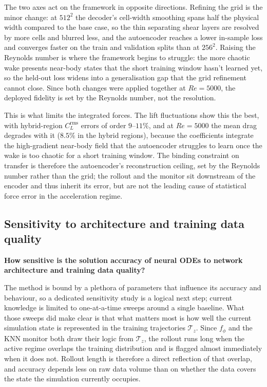 The two axes act on the framework in opposite directions. Refining the grid is the minor change: at $512^2$ the decoder's cell-width smoothing spans half the physical width compared to the base case, so the thin separating shear layers are resolved by more cells and blurred less, and the autoencoder reaches a lower in-sample loss and converges faster on the train and validation splits than at $256^2$. Raising the Reynolds number is where the framework begins to struggle: the more chaotic wake presents near-body states that the short training window hasn't learned yet, so the held-out loss widens into a generalisation gap that the grid refinement cannot close. Since both changes were applied together at $Re=5000$, the deployed fidelity is set by the Reynolds number, not the resolution.

This is what limits the integrated forces. The lift fluctuations show this the best, with hybrid-region $C_L^\text{rms}$ errors of order $9$--$11\%$, and at $Re=5000$ the mean drag degrades with it ($8.5\%$ in the hybrid regions), because the coefficients integrate the high-gradient near-body field that the autoencoder struggles to learn once the wake is too chaotic for a short training window. The binding constraint on transfer is therefore the autoencoder's reconstruction ceiling, set by the Reynolds number rather than the grid; the rollout and the monitor sit downstream of the encoder and thus inherit its error, but are not the leading cause of statistical force error in the acceleration regime. 


\subsection{Sensitivity to architecture and training data quality}

\noindent\textbf{How sensitive is the solution accuracy of neural ODEs to network architecture and training data quality?}

The method is bound by a plethora of parameters that influence its accuracy and behaviour, so a dedicated sensitivity study is a logical next step; current knowledge is limited to one-at-a-time sweeps around a single baseline. What those sweeps did make clear is that what matters most is how well the current simulation state is represented in the training trajectories $\boldsymbol{\mathcal{T}}_z$. Since $f_\phi$ and the KNN monitor both draw their logic from $\boldsymbol{\mathcal{T}}_z$, the rollout runs long when the active regime overlaps the training distribution and is flagged almost immediately when it does not. Rollout length is therefore a direct reflection of that overlap, and accuracy depends less on raw data volume than on whether the data covers the state the simulation currently occupies.

